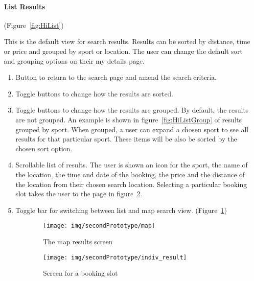 \paragraph{List Results} (Figure~\ref{fig:HiList})


This is the default view for search results. Results can be sorted
by distance, time or price and grouped by sport or location. The user
can change the default sort and grouping options on their my details
page.
\begin{enumerate}
	\item Button to return to the search page and amend the search criteria.
	\item Toggle buttons to change how the results are sorted.
	\item Toggle buttons to change how the results are grouped. By default,
		  the results are not grouped. An example is shown in figure~\ref{fig:HiListGroup}
		  of results grouped by sport. When grouped, a user can expand a chosen
		  sport to see all results for that particular sport. These items will
		  be also be sorted by the chosen sort option.
	\item Scrollable list of results. The user is shown an icon for the sport,
		  the name of the location, the time and date of the booking, the price
		  and the distance of the location from their chosen search location.
		  Selecting a particular booking slot takes the user to the page in
		  figure~\ref{fig:HiIndResult}.
	\item Toggle bar for switching between list and map search view. (Figure~\ref{fig:HiMap})
\end{enumerate}

\begin{figure}[htbp]
	\centering
	\begin{subfigure}[b]{0.45\textwidth}
		\texttt{[image: img/secondPrototype/map]}
		\caption{The map results screen}\label{fig:HiMap}
	\end{subfigure}%
	\qquad
	\begin{subfigure}[b]{0.45\textwidth}
		\texttt{[image: img/secondPrototype/indiv\_result]}
		\caption{Screen for a booking slot}\label{fig:HiIndResult}
	\end{subfigure}
	\caption{}\label{fig:MapResult}
\end{figure}

